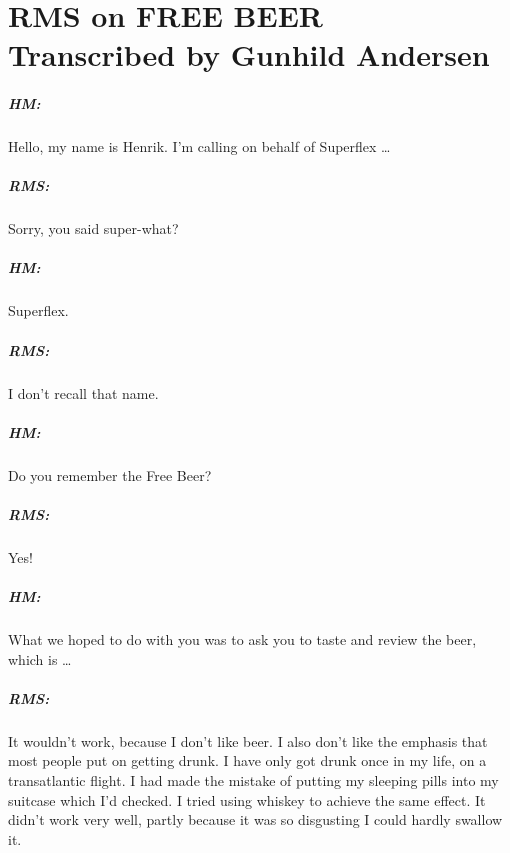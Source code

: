 \begin{savequote}
\end{savequote}
\chapter[RMS on FREE BEER]{RMS on FREE BEER\\ \Large{Transcribed by Gunhild Andersen}}
\label{c:rms_free_beer}

\paragraph{HM:}{Hello, my name is Henrik. I'm calling on behalf of
Superf\hbox{}lex \dots}

\paragraph{RMS:}{Sorry, you said super-what?}

\paragraph{HM:}{Superf\hbox{}lex.}

\paragraph{RMS:}{I don't recall that name.}

\paragraph{HM:}{Do you remember the Free Beer?}

\paragraph{RMS:}{Yes!}

\paragraph{HM:}{What we hoped to do with you was to ask you to taste and review
the beer, which is \ldots}

\paragraph{RMS:}{It wouldn't work, because I don't like beer. I also don't like
the emphasis that most people put on getting drunk. I have only got drunk once
in my life, on a transatlantic f\hbox{}light. I had made the mistake of putting
my sleeping pills into my suitcase which I'd checked. I tried using whiskey to
achieve the same ef\hbox{}fect. It didn't work very well, partly because it was
so disgusting I could hardly swallow it.}

